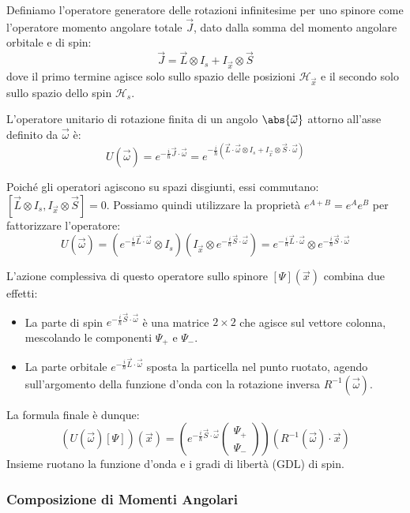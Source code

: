 Definiamo l'operatore generatore delle rotazioni infinitesime per uno spinore come l'operatore momento angolare totale \( \vec{J} \), dato dalla somma del momento angolare orbitale e di spin:
\[
    \vec{J} = \vec{L} \otimes I_s + I_{\vec{x}} \otimes \vec{S}
\]
dove il primo termine agisce solo sullo spazio delle posizioni \( \mathcal{H}_{\vec{x}} \) e il secondo solo sullo spazio dello spin \( \mathcal{H}_s \).

L'operatore unitario di rotazione finita di un angolo \( \abs{\vec{\omega}} \) attorno all'asse definito da \( \vec{\omega} \) è:
\[
    U(\vec{\omega}) = e^{-\frac{i}{\hbar} \vec{J} \cdot \vec{\omega}} = e^{-\frac{i}{\hbar} (\vec{L} \cdot \vec{\omega} \otimes I_s + I_{\vec{x}} \otimes \vec{S} \cdot \vec{\omega})}
\]

Poiché gli operatori agiscono su spazi disgiunti, essi commutano: \( [\vec{L} \otimes I_s, I_{\vec{x}} \otimes \vec{S}] = 0 \). Possiamo quindi utilizzare la proprietà \( e^{A+B} = e^A e^B \) per fattorizzare l'operatore:
\[
    U(\vec{\omega}) = \left( e^{-\frac{i}{\hbar} \vec{L} \cdot \vec{\omega}} \otimes I_s \right) \left( I_{\vec{x}} \otimes e^{-\frac{i}{\hbar} \vec{S} \cdot \vec{\omega}} \right)
    = e^{-\frac{i}{\hbar} \vec{L} \cdot \vec{\omega}} \otimes e^{-\frac{i}{\hbar} \vec{S} \cdot \vec{\omega}}
\]

L'azione complessiva di questo operatore sullo spinore \( [\Psi](\vec{x}) \) combina due effetti:
\begin{itemize}
    \item La parte di spin \( e^{-\frac{i}{\hbar} \vec{S} \cdot \vec{\omega}} \) è una matrice \( 2\times 2 \) che agisce sul vettore colonna, mescolando le componenti \( \Psi_+ \) e \( \Psi_- \).
    \item La parte orbitale \( e^{-\frac{i}{\hbar} \vec{L} \cdot \vec{\omega}} \) sposta la particella nel punto ruotato, agendo sull'argomento della funzione d'onda con la rotazione inversa \( R^{-1}(\vec{\omega}) \).
\end{itemize}

La formula finale è dunque:
\[
    (U(\vec{\omega})[\Psi])(\vec{x}) = \left( e^{-\frac{i}{\hbar} \vec{S} \cdot \vec{\omega}} \begin{pmatrix} \Psi_+ \\ \Psi_- \end{pmatrix} \right) (R^{-1}(\vec{\omega}) \cdot \vec{x})
\]
Insieme ruotano la funzione d'onda e i gradi di libertà (GDL) di spin.

\subsubsection{Composizione di Momenti Angolari}

